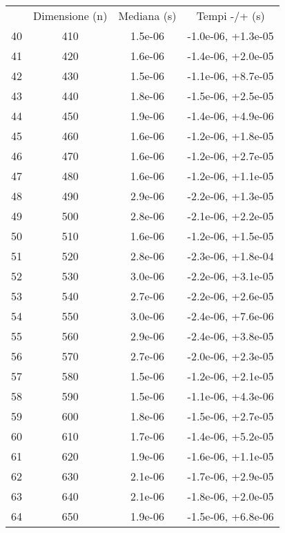 \begin{table}
\centering
\begin{adjustbox}{width=1\textwidth/2}
\begin{tabular}{|c|c|c|c|}
\hline
 & Dimensione (n) & Mediana (s) & Tempi -/+ (s) \\
40 & 410 & 1.5e-06 & -1.0e-06, +1.3e-05 \\
\cline{1-4}
41 & 420 & 1.6e-06 & -1.4e-06, +2.0e-05 \\
\cline{1-4}
42 & 430 & 1.5e-06 & -1.1e-06, +8.7e-05 \\
\cline{1-4}
43 & 440 & 1.8e-06 & -1.5e-06, +2.5e-05 \\
\cline{1-4}
44 & 450 & 1.9e-06 & -1.4e-06, +4.9e-06 \\
\cline{1-4}
45 & 460 & 1.6e-06 & -1.2e-06, +1.8e-05 \\
\cline{1-4}
46 & 470 & 1.6e-06 & -1.2e-06, +2.7e-05 \\
\cline{1-4}
47 & 480 & 1.6e-06 & -1.2e-06, +1.1e-05 \\
\cline{1-4}
48 & 490 & 2.9e-06 & -2.2e-06, +1.3e-05 \\
\cline{1-4}
49 & 500 & 2.8e-06 & -2.1e-06, +2.2e-05 \\
\cline{1-4}
50 & 510 & 1.6e-06 & -1.2e-06, +1.5e-05 \\
\cline{1-4}
51 & 520 & 2.8e-06 & -2.3e-06, +1.8e-04 \\
\cline{1-4}
52 & 530 & 3.0e-06 & -2.2e-06, +3.1e-05 \\
\cline{1-4}
53 & 540 & 2.7e-06 & -2.2e-06, +2.6e-05 \\
\cline{1-4}
54 & 550 & 3.0e-06 & -2.4e-06, +7.6e-06 \\
\cline{1-4}
55 & 560 & 2.9e-06 & -2.4e-06, +3.8e-05 \\
\cline{1-4}
56 & 570 & 2.7e-06 & -2.0e-06, +2.3e-05 \\
\cline{1-4}
57 & 580 & 1.5e-06 & -1.2e-06, +2.1e-05 \\
\cline{1-4}
58 & 590 & 1.5e-06 & -1.1e-06, +4.3e-06 \\
\cline{1-4}
59 & 600 & 1.8e-06 & -1.5e-06, +2.7e-05 \\
\cline{1-4}
60 & 610 & 1.7e-06 & -1.4e-06, +5.2e-05 \\
\cline{1-4}
61 & 620 & 1.9e-06 & -1.6e-06, +1.1e-05 \\
\cline{1-4}
62 & 630 & 2.1e-06 & -1.7e-06, +2.9e-05 \\
\cline{1-4}
63 & 640 & 2.1e-06 & -1.8e-06, +2.0e-05 \\
\cline{1-4}
64 & 650 & 1.9e-06 & -1.5e-06, +6.8e-06 \\

\end{tabular}
\end{adjustbox}
\end{table}
